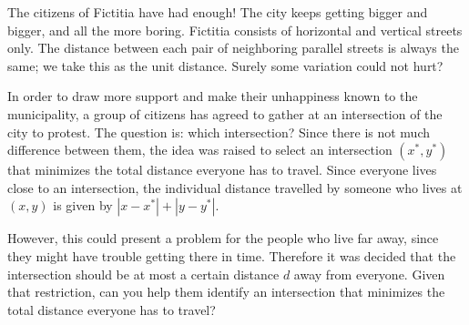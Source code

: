 
%
\noindent
The citizens of Fictitia have had enough! The city keeps getting bigger and bigger, and all the more boring. Fictitia consists of horizontal and vertical streets only. The distance between each pair of neighboring parallel streets is always the same; we take this as the unit distance. Surely some variation could not hurt?

In order to draw more support and make their unhappiness known to the municipality, a group of citizens has agreed to gather at an intersection of the city to protest. The question is: which intersection? Since there is not much difference between them, the idea was raised to select an intersection $(x^*,y^*)$ that minimizes the total distance everyone has to travel. Since everyone lives close to an intersection, the individual distance travelled by someone who lives at $(x,y)$ is given by $|x-x^*|+|y-y^*|$.

However, this could present a problem for the people who live far away, since they might have trouble getting there in time. Therefore it was decided that the intersection should be at most a certain distance $d$ away from everyone. Given that restriction, can you help them identify an intersection that minimizes the total distance everyone has to travel?





